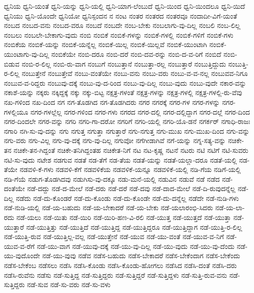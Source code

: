 {ಧ್ವನಿಯ
ಧ್ವನಿ-ಯಂತೆ
ಧ್ವನಿ-ಯನ್ನು
ಧ್ವನಿ-ಯಲ್ಲಿ
ಧ್ವನಿ-ಯಾಗ-ಲೆಂಬುದೆ
ಧ್ವನಿ-ಯಿಂದ
ಧ್ವನಿ-ಯಿಂದಲೂ
ಧ್ವನಿ-ಯಿದೆ
ಧ್ವನಿಯು
ಧ್ವನಿ-ಯೊಂದೇ
ಧ್ವನಿಯೋ
ಧ್ವನಿಸ್ಪಂದನ
ನ
ನಂಟ
ನಂತರ
ನಂತರದ
ನಂತರವೂ
ನಂದಾದೀ-ವಿಗೆ-ಯಂತೆ
ನಂಬದ
ನಂಬದ-ವನು
ನಂಬದ-ವರೂ
ನಂಬದೆ
ನಂಬದೇ
ನಂಬ-ಬೇಕು
ನಂಬಲಾಗು-ವು-ದಿಲ್ಲ
ನಂಬಲಿ
ನಂಬ-ಲಿಲ್ಲ
ನಂಬಲು
ನಂಬಲೇ-ಬೇಕಾಗು-ವುದು
ನಂಬಿ
ನಂಬಿಕೆ
ನಂಬಿಕೆ-ಗಳನ್ನು
ನಂಬಿಕೆ-ಗಳಲ್ಲಿ
ನಂಬಿಕೆ-ಗಳಿಗೆ
ನಂಬಿಕೆ-ಗಳು
ನಂಬಿಕೆಯ
ನಂಬಿಕೆ-ಯನ್ನು
ನಂಬಿಕೆ-ಯನ್ನೆಲ್ಲ
ನಂಬಿಕೆ-ಯಿಲ್ಲ
ನಂಬಿಕೆ-ಯಿಲ್ಲವೆ
ನಂಬಿಕೆ-ಯುಂಟಾಗಿ
ನಂಬಿಕೆ-ಯುಂಟಾಗು-ವು-ದಿಲ್ಲ
ನಂಬಿಕೆಯೇ
ನಂಬಿ-ದರೂ
ನಂಬಿ-ದರೆ
ನಂಬಿ-ದವ-ರನ್ನು
ನಂಬಿ-ದ-ವ-ರಿಗೆ
ನಂಬಿದೆ
ನಂಬಿ-ಬಿಡುವ
ನಂಬಿ-ರ-ಲಿಲ್ಲ
ನಂಬಿ-ರು-ವಾಗ
ನಂಬುಗೆ
ನಂಬುತ್ತಾನೆ
ನಂಬುತ್ತಾ-ರಲ್ಲ
ನಂಬುತ್ತಾರೆ
ನಂಬುತ್ತಿದ್ದುದು
ನಂಬುತ್ತಿ-ರ-ಲಿಲ್ಲ
ನಂಬುತ್ತೇನೆ
ನಂಬುತ್ತೇವೆ
ನಂಬು-ವಂತೆಯೇ
ನಂಬು-ವನು
ನಂಬು-ವರು
ನಂಬು-ವ-ವ-ನಲ್ಲ
ನಂಬುವವ-ನಿಗೂ
ನಂಬುವ-ವ-ರಿದ್ದರು
ನಂಬುವು-ದಕ್ಕೆ
ನಂಬು-ವು-ದ-ರಿಂದ
ನಂಬು-ವು-ದಿಲ್ಲ
ನಂಬು-ವುದು
ನಂಬು-ವುದೇ
ನಕಾರ-ವನ್ನು
ನಕಾಶೆ-ಯನ್ನು
ನಕ್ಕರು
ನಕ್ಕಿದ್ದಕ್ಕೆ
ನಕ್ಕು
ನಕ್ಕು-ಬಿಟ್ಟ
ನಕ್ಷತ್ರ-ಗಳಂತೆ
ನಕ್ಷತ್ರ-ಗಳನ್ನು
ನಕ್ಷತ್ರ-ಗಳಲ್ಲಿ
ನಕ್ಷತ್ರ-ಗಳಲ್ಲಿ-ರು-ವೆವು
ನಖ-ಗಳಿಂದ
ನಖ-ದಿಂದ
ನಗ
ನಗ-ತೊಡಗಿದ
ನಗ-ತೊಡಗಿದರು
ನಗರ
ನಗರಕ್ಕೆ
ನಗರ-ಗಳ
ನಗರ-ಗಳನ್ನು
ನಗರ-ಗಳಲ್ಲಿಯೂ
ನಗರ-ಗಳಲ್ಲೆಲ್ಲ
ನಗರ-ಗಳಿಂದ
ನಗರ-ಗಳು
ನಗರದ
ನಗರ-ದಲ್ಲಿ
ನಗರ-ದಲ್ಲಿದ್ದಾಗ
ನಗರ-ದಲ್ಲೆ
ನಗರ-ದಿಂದ
ನಗರ-ದಿಂದಲೇ
ನಗರ-ವನ್ನು
ನಗರಿ
ನಗರಿ-ಗಾ-ದರೋ
ನಗರಿಗೆ
ನಗರಿ-ಯಲ್ಲಿ
ನಗರಿ-ಯೊ-ಡನೆ
ನಗರ್ಕರ್
ನಗಾಧಿ-ರಾಜಃ
ನಗಾರಿ
ನಗಿ-ಸು-ವು-ದನ್ನು
ನಗು
ನಗುತ್ತ
ನಗುತ್ತಾ
ನಗುತ್ತಾರೆ
ನಗು-ನಗುತ್ತ
ನಗು-ಮುಖ
ನಗು-ಮುಖ-ದಿಂದ
ನಗು-ವನ್ನು
ನಗು-ವರು
ನಗು-ವಿಲ್ಲ
ನಗು-ವು-ದಕ್ಕೆ
ನಗು-ವು-ದಿಲ್ಲ
ನಗುವೋ
ನಗೆಗೀಡಾಗಿವೆ
ನಗೆ-ಯನ್ನು
ನಗ್ನ-ಸತ್ಯ-ವನ್ನು
ನಚಿಕೇ-ತನ
ನಚಿಕೇ-ತನ-ಗಿದ್ದಂತೆ
ನಚಿಕೇ-ತನಿಗಿದ್ದಂತಹ
ನಚಿಕೇತ-ನಿಗೆ
ನಟ
ನಟ-ಕೃಷ್ಣ
ನಟನೆ
ನಟರು
ನಟಿ
ನಟಿಗೆ
ನಟಿ-ಸುವರು
ನಟಿ-ಸು-ವುದು
ನಟೇಶ
ನಡಗುವ
ನಡತೆ
ನಡ-ತೆಗೆ
ನಡ-ತೆಯ
ನಡತೆ-ಯನ್ನು
ನಡತೆ-ಯಲ್ಲಾ-ದರೂ
ನಡತೆ-ಯಲ್ಲಿ
ನಡ-ತೆಯೇ
ನಡವಳಿ-ಕೆ-ಗಳು
ನಡವಳಿ-ಕೆಗೆ
ನಡವಳಿಕೆಯ
ನಡವಳಿಕೆ-ಯನ್ನೂ
ನಡವಳಿಕೆ-ಯಲ್ಲಿ
ನಡಿ-ಗೆಯ
ನಡಿಗೆ-ಯಲ್ಲಿ
ನಡಿ-ಗೆಯೆ
ನಡುಗ-ತೊಡಗಿದವು
ನಡುಗಿಸು-ವು-ದಕ್ಕೂ
ನಡು-ಮನೆ-ಯಲ್ಲಿ
ನಡುವಿನ
ನಡುವೆ
ನಡೆ
ನಡೆದ
ನಡೆ-ದಂತೆಯೇ
ನಡೆ-ದದ್ದು
ನಡೆ-ದ-ಮೇಲೆ
ನಡೆ-ದರು
ನಡೆ-ದರೆ
ನಡೆ-ದವು
ನಡೆ-ದಾದ-ಮೇಲೆ
ನಡೆ-ದಿ-ರುವುದನ್ನೆಲ್ಲ
ನಡೆ-ದಿಲ್ಲ
ನಡೆದು
ನಡೆ-ದು-ಕೊಂಡರೆ
ನಡೆ-ದು-ಕೊಂಡು
ನಡೆ-ದು-ಕೊಂಡೇ
ನಡೆ-ದು-ದನ್ನೆಲ್ಲ
ನಡೆದೇ
ನಡೆ-ನುಡಿ-ಗಳು
ನಡೆ-ನುಡಿ-ಯಲ್ಲಿ
ನಡೆ-ಯ-ಬಹುದು
ನಡೆ-ಯ-ಬೇಕಾದರೆ
ನಡೆ-ಯ-ಬೇಕು
ನಡೆ-ಯಲಾರಂಭಿ-ಸಿದರು
ನಡೆ-ಯ-ಲಾ-ರದು
ನಡೆ-ಯಲು
ನಡೆ-ಯಿತು
ನಡೆ-ಯಿರಿ
ನಡೆ-ಯಿರಿ-ಹಣ-ವಿ-ರಲಿ
ನಡೆ-ಯುತ್ತ
ನಡೆ-ಯುತ್ತದೆ
ನಡೆ-ಯುತ್ತಾ
ನಡೆ-ಯುತ್ತಾರೆ
ನಡೆ-ಯುತ್ತಿತ್ತು
ನಡೆ-ಯುತ್ತಿದೆ
ನಡೆ-ಯುತ್ತಿದ್ದ
ನಡೆ-ಯುತ್ತಿದ್ದರೂ
ನಡೆ-ಯುತ್ತಿದ್ದಾಗ
ನಡೆ-ಯುತ್ತಿ-ರ-ಲಿಲ್ಲ
ನಡೆ-ಯುತ್ತಿ-ರುವ
ನಡೆ-ಯುತ್ತಿಲ್ಲ-ವಲ್ಲ
ನಡೆ-ಯುತ್ತೇನೆ
ನಡೆ-ಯುವ
ನಡೆ-ಯು-ವಂತೆ
ನಡೆ-ಯುವ-ವ-ನಿಗೆ
ನಡೆ-ಯುವ-ವ-ರೆಗೆ
ನಡೆ-ಯು-ವಾಗ
ನಡೆ-ಯುವು-ದಕ್ಕೆ
ನಡೆ-ಯು-ವು-ದಿಲ್ಲ
ನಡೆ-ಯು-ವುದು
ನಡೆ-ಯು-ವು-ದೆಂದು
ನಡೆ-ಯು-ವುದೊಂದೇ
ನಡೆ-ಯು-ವುವು
ನಡೆವ
ನಡೆಸ-ಬಹುದು
ನಡೆಸ-ಬೇಕಾದರೆ
ನಡೆಸ-ಬೇಕೆಂದಾಗ
ನಡೆಸ-ಬೇಕೆಂದು
ನಡೆಸ-ಬೇಕೆಂಬ
ನಡೆಸಲು
ನಡೆಸಿ
ನಡೆಸಿ-ಕೊಂಡು
ನಡೆಸಿ-ಕೊಂಡು-ಹೋಗಲು
ನಡೆಸಿದ
ನಡೆಸಿ-ದಂತೆ
ನಡೆಸಿ-ದರು
ನಡೆಸಿ-ರುವೆನು
ನಡೆಸು
ನಡೆ-ಸುತ್ತಿದ್ದ
ನಡೆ-ಸುತ್ತಿದ್ದರು
ನಡೆ-ಸುತ್ತಿದ್ದರೆ
ನಡೆ-ಸುತ್ತಿದ್ದಳು
ನಡೆ-ಸುತ್ತಿ-ರುವ-ವನು
ನಡೆ-ಸುತ್ತಿದ್ದರು
ನಡೆ-ಸುವ
ನಡೆ-ಸು-ವರು
ನಡೆ-ಸು-ವಳು
}
